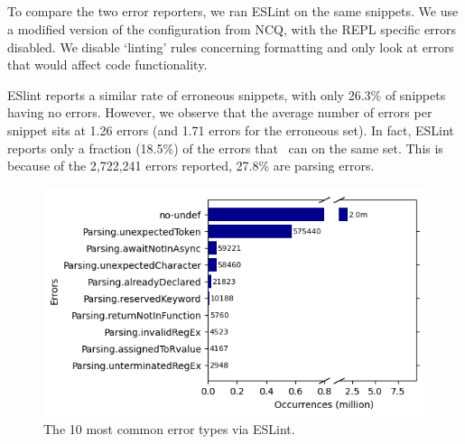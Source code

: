 \documentclass[conference]{IEEEtran}
\begin{document}
\vspace{0.5cm}
\vspace{1em}

\subsection{\rqtwo}
\label{sec:rq2}

To compare the two error reporters, we ran ESLint on the same snippets. We use a modified version of the configuration from NCQ, with the REPL specific errors disabled. We disable `linting' rules concerning formatting and only look at errors that would affect code functionality.

ESlint reports a similar rate of erroneous snippets, with only 26.3\% of snippets having no errors. However, we observe that the average number of errors per snippet sits at 1.26 errors (and 1.71 errors for the erroneous set). In fact, ESLint reports only a fraction (18.5\%) of the errors that \ts\ can on the same set. This is because of the 2,722,241 errors reported, 27.8\% are parsing errors. 

\begin{figure}[h]
    \centering
    \includegraphics[width=0.8\linewidth]{images/eslint-commonErrorTypes.png}
    \caption{The 10 most common error types via ESLint.}
    \label{fig:eslint_common_err}
\end{figure}
\end{document}

